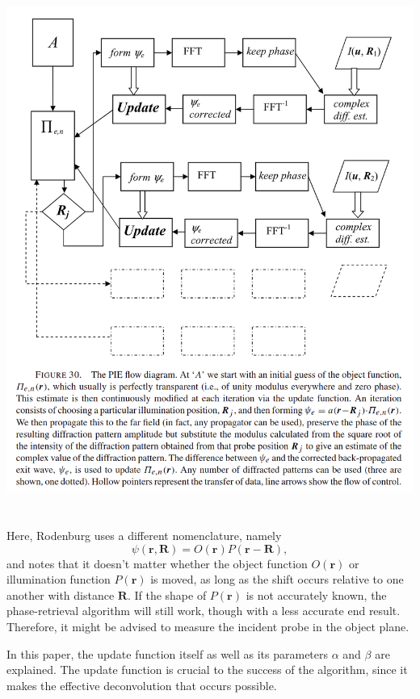 \documentclass{article}
\begin{document}
\includegraphics[width=\textwidth]{figures/PIE_diagram.png}

\section{\cite{Rodenburg2004-oi} }

Here, Rodenburg uses a different nomenclature, namely
\begin{equation}
    \psi(\bm{r},\bm{R})=O(\bm{r})P(\bm{r}-\bm{R}),
\end{equation}
and notes that it doesn't matter whether the object function $O(\bm{r})$ or illumination function $P(\bm{r})$ is moved, as long as the shift occurs relative to one another with distance $\bm{R}$. If the shape of $P(\bm{r})$ is not accurately known, the phase-retrieval algorithm will still work, though with a less accurate end result. Therefore, it might be advised to measure the incident probe in the object plane.

In this paper, the update function itself as well as its parameters $\alpha$ and $\beta$ are explained. The update function is crucial to the success of the algorithm, since it makes the effective deconvolution that occurs possible.
\end{document}

